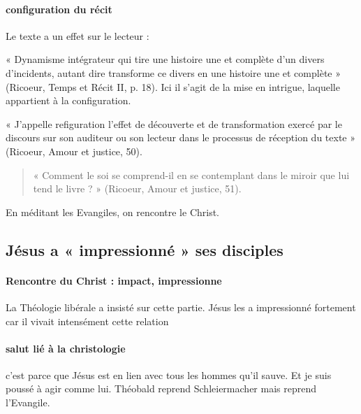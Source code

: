 \paragraph{configuration du récit } Le texte a un effet sur le lecteur : 
\begin{Def}[Configuration]
« Dynamisme intégrateur qui tire une histoire une et complète d’un divers
d’incidents, autant dire transforme ce divers en une histoire une et complète » (Ricoeur,
Temps et Récit II, p. 18). Ici il s’agit de la mise en intrigue, laquelle appartient à la
configuration.
\end{Def}

\begin{Def}[Refiguration]
 
    « J’appelle refiguration l’effet de découverte et de transformation exercé par
le discours sur son auditeur ou son lecteur dans le processus de réception du texte » (Ricoeur,
Amour et justice, 50).
 
\end{Def}
\begin{quote}
    « Comment le soi se comprend-il en se contemplant dans le miroir que lui tend le livre ? » (Ricoeur, Amour et justice, 51). 
\end{quote}
En méditant les Evangiles, on rencontre le Christ.  



\subsection{Jésus a « impressionné » ses disciples}

\paragraph{Rencontre du Christ : impact, impressionne} La Théologie libérale a insisté sur cette partie. Jésus les a impressionné fortement car il vivait intensément cette relation 

\paragraph{salut lié à la christologie} c'est parce que Jésus est en lien avec tous les hommes qu'il sauve. Et je suis poussé à agir comme lui. Théobald reprend Schleiermacher mais reprend l'Evangile.

